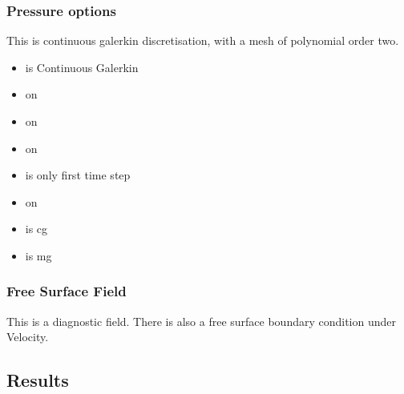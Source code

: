 \subsubsection{Pressure options}

This is continuous galerkin discretisation, with a mesh of polynomial order two.
\begin{itemize}
\item {} is Continuous Galerkin
\item {}  on
\item {} on
\item {}  on
\item {} is only first time step
\item {}  on
\item {} is  cg 
\item {} is  mg
\end{itemize}

\subsubsection{Free Surface Field}
This is a diagnostic field. There is also a free surface boundary condition under Velocity.

\subsection{Results}




